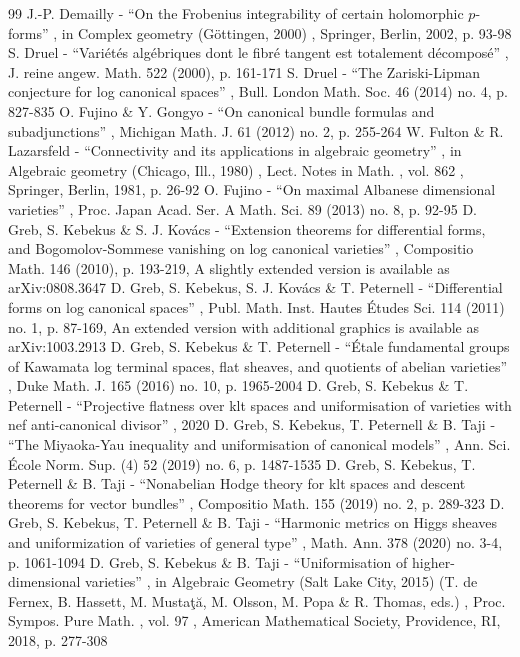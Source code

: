 \documentclass[11pt]{article}
\theoremstyle{plain}
\theoremstyle{definition}
\numberwithin{equation}{thm}
\numberwithin{enumi}{thm}
\begin{document}
\begin{thebibliography}{99}
 J.-P. Demailly - “On the Frobenius integrability of certain holomorphic $p$-forms” , in Complex geometry (Göttingen, 2000) , Springer, Berlin, 2002, p. 93-98
 S. Druel - “Variétés algébriques dont le fibré tangent est totalement décomposé” , J. reine angew. Math. 522 (2000), p. 161-171
 S. Druel - “The Zariski-Lipman conjecture for log canonical spaces” , Bull. London Math. Soc. 46 (2014) no. 4, p. 827-835
 O. Fujino \& Y. Gongyo - “On canonical bundle formulas and subadjunctions” , Michigan Math. J. 61 (2012) no. 2, p. 255-264
 W. Fulton \& R. Lazarsfeld - “Connectivity and its applications in algebraic geometry” , in Algebraic geometry (Chicago, Ill., 1980) , Lect. Notes in Math. , vol. 862 , Springer, Berlin, 1981, p. 26-92
 O. Fujino - “On maximal Albanese dimensional varieties” , Proc. Japan Acad. Ser. A Math. Sci. 89 (2013) no. 8, p. 92-95
 D. Greb, S. Kebekus \& S. J. Kovács - “Extension theorems for differential forms, and Bogomolov-Sommese vanishing on log canonical varieties” , Compositio Math. 146 (2010), p. 193-219, A slightly extended version is available as arXiv:0808.3647
 D. Greb, S. Kebekus, S. J. Kovács \& T. Peternell - “Differential forms on log canonical spaces” , Publ. Math. Inst. Hautes Études Sci. 114 (2011) no. 1, p. 87-169, An extended version with additional graphics is available as arXiv:1003.2913
 D. Greb, S. Kebekus \& T. Peternell - “Étale fundamental groups of Kawamata log terminal spaces, flat sheaves, and quotients of abelian varieties” , Duke Math. J. 165 (2016) no. 10, p. 1965-2004
 D. Greb, S. Kebekus \& T. Peternell - “Projective flatness over klt spaces and uniformisation of varieties with nef anti-canonical divisor” , 2020
 D. Greb, S. Kebekus, T. Peternell \& B. Taji - “The Miyaoka-Yau inequality and uniformisation of canonical models” , Ann. Sci. École Norm. Sup. (4) 52 (2019) no. 6, p. 1487-1535
 D. Greb, S. Kebekus, T. Peternell \& B. Taji - “Nonabelian Hodge theory for klt spaces and descent theorems for vector bundles” , Compositio Math. 155 (2019) no. 2, p. 289-323
 D. Greb, S. Kebekus, T. Peternell \& B. Taji - “Harmonic metrics on Higgs sheaves and uniformization of varieties of general type” , Math. Ann. 378 (2020) no. 3-4, p. 1061-1094
 D. Greb, S. Kebekus \& B. Taji - “Uniformisation of higher-dimensional varieties” , in Algebraic Geometry (Salt Lake City, 2015) (T. de Fernex, B. Hassett, M. Mustaţă, M. Olsson, M. Popa \& R. Thomas, eds.) , Proc. Sympos. Pure Math. , vol. 97 , American Mathematical Society, Providence, RI, 2018, p. 277-308

\end{thebibliography}
\end{document}
